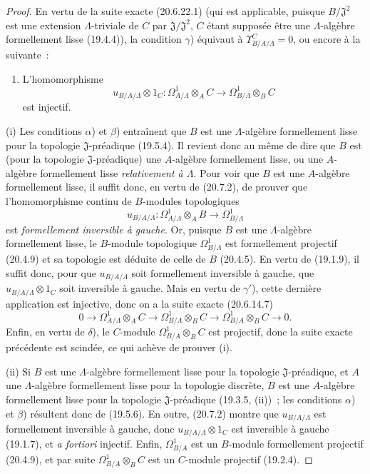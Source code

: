 \begin{proof}
En vertu de la suite exacte (20.6.22.1) (qui est applicable, puisque
$B/\mathfrak J^2$ est une extension $\Lambda$-triviale de $C$ par
$\mathfrak J/\mathfrak J^2$, $C$ étant supposée être une $\Lambda$-algèbre
formellement lisse (19.4.4)), la condition $\gamma$) équivaut à
$\Upsilon^C_{B/A/\Lambda}=0$, ou encore à la suivante~:
\begin{enumerate}
  \item[$\gamma'$)] L'homomorphisme
  \[
    u_{B/A/\Lambda}\otimes 1_C:
    \Omega^1_{A/\Lambda}\otimes_A C
    \longrightarrow \Omega^1_{B/\Lambda}\otimes_B C
  \]
  est injectif.
\end{enumerate}

(i) Les conditions $\alpha$) et $\beta$) entraînent que $B$ est une
$\Lambda$-algèbre formellement lisse pour la topologie
$\mathfrak J$-préadique (19.5.4). Il revient donc au même de dire que $B$ est
(pour la topologie $\mathfrak J$-préadique) une $A$-algèbre formellement
lisse, ou une $A$-algèbre formellement lisse \emph{relativement à $\Lambda$}.
Pour voir que $B$ est une $A$-algèbre formellement lisse, il suffit donc, en
vertu de (20.7.2), de prouver que l'homomorphisme continu de $B$-modules
topologiques
\[
  u_{B/A/\Lambda}:\Omega^1_{A/\Lambda}\otimes_A B
  \longrightarrow\Omega^1_{B/\Lambda}
\]
est \emph{formellement inversible à gauche}. Or, puisque $B$ est une
$\Lambda$-algèbre formellement lisse, le $B$-module topologique
$\Omega^1_{B/\Lambda}$ est formellement projectif (20.4.9) et sa topologie
est déduite de celle de $B$ (20.4.5). En vertu de (19.1.9), il suffit donc,
pour que $u_{B/A/\Lambda}$ soit formellement inversible à gauche, que
$u_{B/A/\Lambda}\otimes 1_C$ soit inversible à gauche. Mais en vertu de
$\gamma'$), cette dernière application est injective, donc on a la suite
exacte (20.6.14.7)
\[
  0\longrightarrow\Omega^1_{A/\Lambda}\otimes_A C
  \longrightarrow\Omega^1_{B/\Lambda}\otimes_B C
  \longrightarrow\Omega^1_{B/A}\otimes_B C\longrightarrow0.
\]
Enfin, en vertu de $\delta$), le $C$-module
$\Omega^1_{B/A}\otimes_BC$ est projectif, donc la suite exacte précédente
est scindée, ce qui achève de prouver (i).


(ii) Si $B$ est une $\Lambda$-algèbre formellement lisse pour la topologie
$\mathfrak J$-préadique, et $A$ une $\Lambda$-algèbre formellement lisse pour
la topologie discrète, $B$ est une $A$-algèbre formellement lisse pour la
topologie $\mathfrak J$-préadique (19.3.5, (ii))~; les conditions $\alpha$) et
$\beta$) résultent donc de (19.5.6). En outre, (20.7.2) montre que
$u_{B/A/\Lambda}$ est formellement inversible à gauche, donc
$u_{B/A/\Lambda}\otimes 1_C$ est inversible à gauche (19.1.7), et \emph{a
fortiori} injectif. Enfin, $\Omega^1_{B/A}$ est un $B$-module formellement
projectif (20.4.9), et par suite $\Omega^1_{B/A}\otimes_BC$ est un $C$-module
projectif (19.2.4).
\end{proof}

